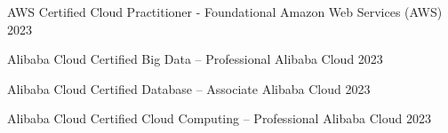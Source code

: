 

\begin{cvhonors}

  \cvhonor
    {AWS Certified Cloud Practitioner - Foundational} %
    {Amazon Web Services (AWS)} %
    {} %
    {2023} %

  \cvhonor
    {Alibaba Cloud Certified Big Data – Professional} %
    {Alibaba Cloud} %
    {} %
    {2023} %

  \cvhonor
    {Alibaba Cloud Certified Database – Associate} %
    {Alibaba Cloud} %
    {} %
    {2023} %

  \cvhonor
    {Alibaba Cloud Certified Cloud Computing – Professional} %
    {Alibaba Cloud} %
    {} %
    {2023} %

\end{cvhonors}
